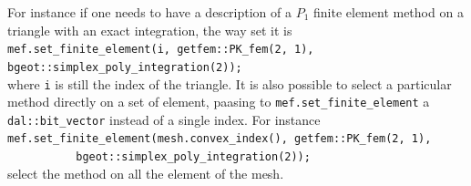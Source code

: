 \documentclass[11pt,a4paper]{article}
\begin{document}
For instance if one needs to have a description of a $P_1$ finite element method on a triangle with an exact integration, the way set it is\\[0.5cm]
{\tt mef.set\_finite\_element(i, getfem::PK\_fem(2, 1), bgeot::simplex\_poly\_integration(2)); }\\[0.5cm]
where {\tt i} is still the index of the triangle. It is also possible to select a particular method directly on a set of element, paasing to {\tt mef.set\_finite\_element} a {\tt dal::bit\_vector} instead of a single index. For instance\\[0.5cm]
{\tt mef.set\_finite\_element(mesh.convex\_index(), getfem::PK\_fem(2, 1),\\$\mbox{}\ \ \ \ \ \ \ \ \ \ \ \ \ \ \ \ \ \ \ \ \ \ $ bgeot::simplex\_poly\_integration(2)); }\\[0.5cm]
select the method on all the element of the mesh.
\end{document}
